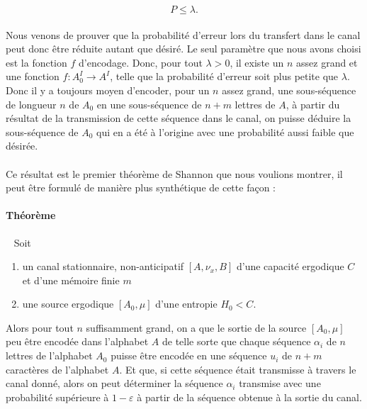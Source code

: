 	\[P\le \lambda.\]
	
	\paragraph{}Nous venons de prouver que la probabilité d'erreur lors du transfert dans le canal peut donc être réduite autant que désiré.
	Le seul paramètre que nous avons choisi est la fonction $f$ d'encodage. Donc, pour tout $\lambda >0$, il existe un $n$ assez grand et
	une fonction $f : A_0^I \to A^I$, telle que la probabilité d'erreur soit plus petite que $\lambda$. Donc il y a toujours moyen d'encoder,
	pour un $n$ assez grand, une sous-séquence de longueur $n$ de $A_0$ en une sous-séquence de $n+m$ lettres de $A$, à partir du résultat 
	de la transmission de cette séquence dans le canal, on puisse déduire la sous-séquence de $A_0$ qui en a été à l'origine avec une 
	probabilité aussi faible que désirée.
	
	\paragraph{}
	Ce résultat est le premier théorème de Shannon que nous voulions montrer, il peut être formulé de manière plus synthétique de cette façon :
	
	\paragraph{Théorème}\ 
	\newline
	Soit 
	\begin{enumerate}
		\item un canal stationnaire, non-anticipatif $[A,\nu_x,B]$ d'une capacité ergodique $C$ et d'une mémoire finie $m$
		\item une source ergodique $[A_0,\mu]$ d'une entropie $H_0<C$.
	\end{enumerate}
	Alors pour tout $n$ suffisamment grand, on a que le sortie de la source $[A_0,\mu]$ peu être encodée dans l'alphabet $A$ de telle sorte que
	chaque séquence $\alpha_i$ de $n$ lettres de l'alphabet $A_0$ puisse être encodée en une séquence $u_i$ de $n+m$ caractères de l'alphabet $A$. 
	Et que, si cette séquence était transmisse à travers le canal donné, alors on peut déterminer la séquence $\alpha_i$ transmise avec une probabilité 
	supérieure à $1-\varepsilon$ à partir de la séquence obtenue à la sortie du canal.
	
